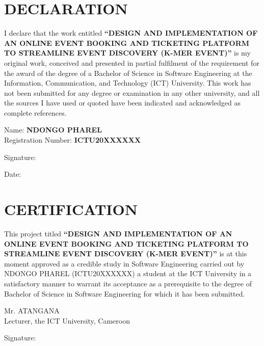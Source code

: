 \documentclass[12pt,a4paper]{report}
\begin{document}
\chapter*{DECLARATION}
I declare that the work entitled \textbf{``DESIGN AND IMPLEMENTATION OF AN ONLINE EVENT
BOOKING AND TICKETING PLATFORM TO STREAMLINE EVENT DISCOVERY (K-MER EVENT)''} is my
original work, conceived and presented in partial fulfilment of the requirement for the
award of the degree of a Bachelor of Science in Software Engineering at the Information,
Communication, and Technology (ICT) University. This work has not been submitted for any
degree or examination in any other university, and all the sources I have used or quoted
have been indicated and acknowledged as complete references.

\vspace{1.5cm}
\noindent Name: \textbf{NDONGO PHAREL}\\[2pt]      %
Registration Number: \textbf{ICTU20XXXXXX}          %

\vspace{1.2cm}
\noindent Signature: \underline{\hspace{6cm}}

\vspace{1.0cm}
\noindent Date: \underline{\hspace{6cm}}

\chapter*{CERTIFICATION}
This project titled \textbf{``DESIGN AND IMPLEMENTATION OF AN ONLINE EVENT BOOKING AND
TICKETING PLATFORM TO STREAMLINE EVENT DISCOVERY (K-MER EVENT)''} is at this moment
approved as a credible study in Software Engineering carried out by NDONGO PHAREL
(ICTU20XXXXXX) a student at the ICT University in a satisfactory manner to warrant its
acceptance as a prerequisite to the degree of Bachelor of Science in Software Engineering
for which it has been submitted.

\vspace{1.2cm}
\noindent Mr. ATANGANA\\
Lecturer, the ICT University, Cameroon

\vspace{1.0cm}
\noindent Signature: \underline{\hspace{6cm}}
\end{document}
